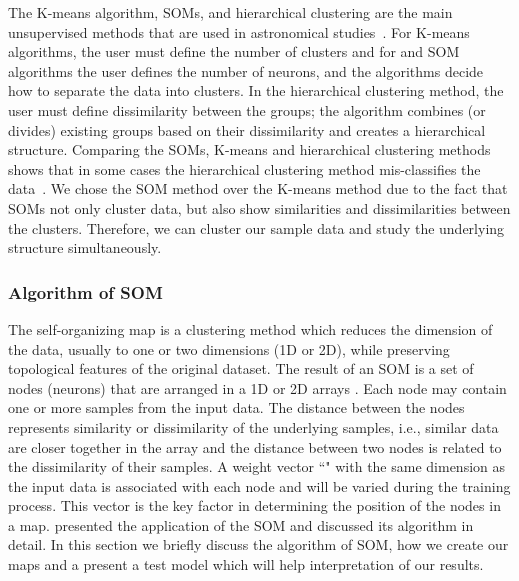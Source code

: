 The K-means algorithm, SOMs, and hierarchical clustering are the main unsupervised methods that are used in astronomical studies~\citep[e.g.][]{DAbrusco12, Aycha16}.
For K-means algorithms, the user must define the number of clusters and for and SOM algorithms the user defines the number of neurons, and the algorithms decide how to separate the data into clusters.
In the hierarchical clustering method, the user must define dissimilarity between the groups; the algorithm combines (or divides) existing groups based on their dissimilarity and creates a hierarchical structure. 
Comparing the SOMs, K-means and hierarchical clustering methods shows that in some cases the hierarchical clustering method mis-classifies the data~\citep[][and references therein]{Mangiameli96}.
We chose the SOM method over the K-means method due to the fact that SOMs not only cluster data, but also show similarities and dissimilarities between the clusters.
Therefore, we can cluster our sample data and study the underlying structure simultaneously.

     
    \subsubsection{Algorithm of SOM} 
   \label{sec: algorithm_somz}
    The self-organizing map is a clustering method which reduces the dimension of the data, usually to one or two dimensions (1D or 2D), while preserving topological features of the original dataset.
    The result of an SOM is a set of nodes (neurons) that are arranged in a 1D or 2D arrays \citep{Kohonen98}. 
    Each node may contain one or more samples from the input data.
    The distance between the nodes represents similarity or dissimilarity of the underlying samples, i.e., similar data are closer together in the array and the distance between two nodes is related to the dissimilarity of their samples.
    A weight vector ``" with the same dimension as the input data is associated with each node and will be varied during the training process.
    This vector is the key factor in determining the position of the nodes in a map.
    \cite{Geach12} presented the application of the SOM and discussed its algorithm in detail.
    In this section we briefly discuss the algorithm of SOM, how we create our maps and a present a  test model which will help interpretation of our results. 
   
